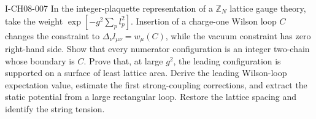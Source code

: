 \begin{exercise}{I-CH08-007}
In the integer-plaquette representation of a $\mathbb Z_N$ lattice gauge
theory, take the weight
$\exp[-g^2\sum_p l_p^2]$.  Insertion of a charge-one Wilson loop $C$ changes
the constraint to $\Delta_\nu l_{\mu\nu}=w_\mu(C)$, while the vacuum
constraint has zero right-hand side.  Show that every numerator configuration
is an integer two-chain whose boundary is $C$.  Prove that, at large $g^2$,
the leading configuration is supported on a surface of least lattice area.
Derive the leading Wilson-loop expectation value, estimate the first
strong-coupling corrections, and extract the static potential from a large
rectangular loop.  Restore the lattice spacing and identify the string
tension.
\end{exercise}
